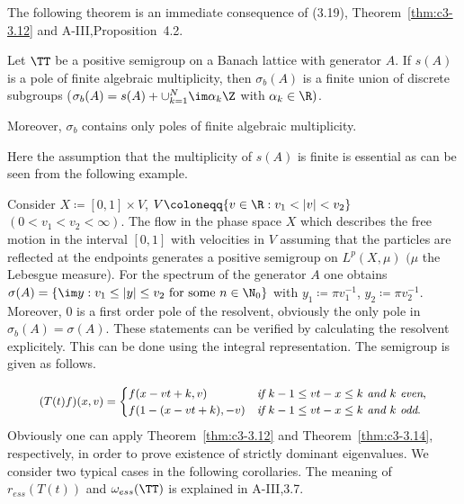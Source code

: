 The following theorem is an immediate consequence of (3.19), Theorem~\ref{thm:c3-3.12} and A-III,Proposition~4.2.

\begin{theorem}\label{thm:c3-3.14}
	Let $\TT$ be a positive semigroup on a Banach lattice with generator $A$. 
	If $s(A)$ is a pole of finite algebraic multiplicity, then $\sigma_{b}(A)$ is a finite union of discrete subgroups (\ie  $\sigma_{b}(A) = s(A) + \cup_{k=1}^{N}\im\alpha_{k}\Z$ with $\alpha_{k} \in \R )$.
	
	Moreover, $\sigma_{b}$ contains only poles of finite algebraic multiplicity.
\end{theorem}

Here the assumption that the multiplicity of $s(A)$ is finite is essential as can be seen from the following example.

\begin{example}\label{ex:c3-3.15}
	Consider $X \coloneqq  [0,1] \times V$, $V \coloneqq  \{v \in \R  : v_{1} < |v| < v_{2}\}$ $(0 < v_{1} < v_{2} < \infty)$. 
	The flow in the phase space $X$ which describes the free motion in the interval $[0,1]$ with velocities in $V$ assuming that the particles are reflected at the endpoints generates a positive semigroup on $L^{p}(X,\mu)$ $(\mu$ the Lebesgue measure). 
	For the spectrum of the generator $A$ one obtains $\sigma(A) = \{\im y : v_{1} \leq |y| \leq v_{2} \text{ for some } n \in \N_{0}\}$ with $y_{1} \coloneqq  \pi v_{1}^{-1}$, $y_{2} \coloneqq  \pi v_{2}^{-1}$. 
	Moreover, $0$ is a first order pole of the resolvent, obviously the only pole in $\sigma_{b}(A) = \sigma(A)$.
	These statements can be verified by calculating the resolvent explicitely. 
	This can be done using the integral representation. 
%
The semigroup is given as follows.

\begin{equation}\label{eq:c3-3.20}
	\textit{\small $
	(T(t)f)(x,v) = \begin{cases}
		f(x-vt+k,v) & \text{if } k-1\leq vt-x\leq k \text{ and } k \textit{ even}, \\
		f(1-(x-vt+k),-v) & \text{if } k-1\leq vt-x\leq k \text{ and } k \text{ odd}.
	\end{cases}
$}
\end{equation} 
Obviously one can apply Theorem~\ref{thm:c3-3.12} and Theorem~\ref{thm:c3-3.14}, respectively, in order to prove existence of strictly dominant eigenvalues. 
We consider two typical cases in the following corollaries. 
The meaning of $r_{ess}(T(t))$ and $\omega_{ess}(\TT)$ is explained in A-III,3.7.
\end{example}


